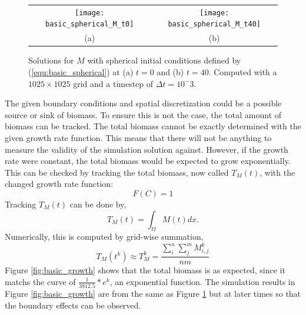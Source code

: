   \begin{figure}
    \centering
    \begin{tabular}{c c}
      \texttt{[image: basic\_spherical\_M\_t0]} & 
      \texttt{[image: basic\_spherical\_M\_t40]} \\
      (a) & (b)
    \end{tabular}
    \caption{Solutions for $M$ with spherical initial conditions defined by (\ref{equ:basic_spherical}) at (a) $t = 0$ and (b) $t = 40$. Computed with a $1025 \times 1025$ grid and a timestep of $\Delta t = 10^-3$.}
    \label{fig:basic_spherical}
  \end{figure}
 
    
  The given boundary conditions and spatial discretization could be a possible source or sink of biomass.
  To ensure this is not the case, the total amount of biomass can be tracked.
  The total biomass cannot be exactly determined with the given growth rate function.
  This means that there will not be anything to measure the validity of the simulation solution against.
  However, if the growth rate were constant, the total biomass would be expected to grow exponentially.
  This can be checked by tracking the total biomass, now called $T_{M}(t)$, with the changed growth rate function:
  \begin{equation} \label{equ:F_constant}
    F(C) = 1
  \end{equation}
  Tracking $T_{M}(t)$ can be done by,
  \begin{equation} \label{equ:total_biomass}
    T_{M}(t) = \int_{\Omega} M(t) dx.
  \end{equation}
  Numerically, this is computed by  grid-wise summation,
  \begin{equation}
    T_{M}(t^k) \approx T_{M}^{k} = \frac{ \sum^n_i \sum^m_j M^{k}_{i,j} }{nm}
  \end{equation}
  Figure \ref{fig:basic_growth} shows that the total biomass is as expected, since it matchs the curve of $\frac{1}{3812.5}*e^{k}$, an exponential function.
  The simulation results in Figure \ref{fig:basic_growth} are from the same as Figure \ref{fig:basic_spherical} but at later times so that the boundary effects can be observed.

